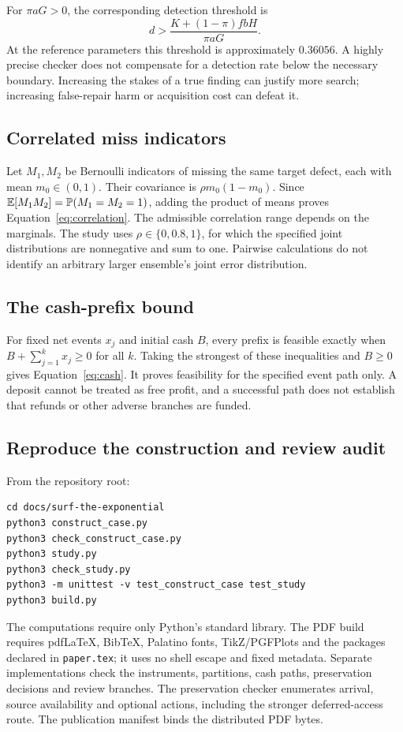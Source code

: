 For $\pi aG>0$, the corresponding detection threshold is
\begin{equation}
d>\frac{K+(1-\pi)fbH}{\pi aG}.
\end{equation}
At the reference parameters this threshold is approximately $0.36056$. A highly precise checker does not compensate for a detection rate below the necessary boundary. Increasing the stakes of a true finding can justify more search; increasing false-repair harm or acquisition cost can defeat it.

\subsection{Correlated miss indicators}
Let $M_1,M_2$ be Bernoulli indicators of missing the same target defect, each with mean $m_0\in(0,1)$. Their covariance is $\rho m_0(1-m_0)$. Since $\mathbb{E}[M_1M_2]=\mathbb{P}(M_1=M_2=1)$, adding the product of means proves Equation~\eqref{eq:correlation}. The admissible correlation range depends on the marginals. The study uses $\rho\in\{0,0.8,1\}$, for which the specified joint distributions are nonnegative and sum to one. Pairwise calculations do not identify an arbitrary larger ensemble's joint error distribution.

\subsection{The cash-prefix bound}
For fixed net events $x_j$ and initial cash $B$, every prefix is feasible exactly when $B+\sum_{j=1}^{k}x_j\geq0$ for all $k$. Taking the strongest of these inequalities and $B\geq0$ gives Equation~\eqref{eq:cash}. It proves feasibility for the specified event path only. A deposit cannot be treated as free profit, and a successful path does not establish that refunds or other adverse branches are funded.

\subsection{Reproduce the construction and review audit}
From the repository root:
\begin{lstlisting}
cd docs/surf-the-exponential
python3 construct_case.py
python3 check_construct_case.py
python3 study.py
python3 check_study.py
python3 -m unittest -v test_construct_case test_study
python3 build.py
\end{lstlisting}
The computations require only Python's standard library. The PDF build requires pdfLaTeX, BibTeX, Palatino fonts, TikZ/PGFPlots and the packages declared in \texttt{paper.tex}; it uses no shell escape and fixed metadata. Separate implementations check the instruments, partitions, cash paths, preservation decisions and review branches. The preservation checker enumerates arrival, source availability and optional actions, including the stronger deferred-access route. The publication manifest binds the distributed PDF bytes.

